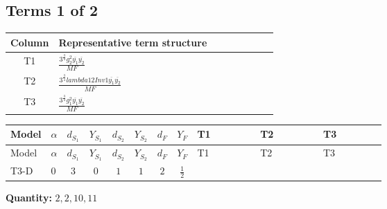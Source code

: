\documentclass[8pt]{article}
\begin{document}
\begin{landscape}
\subsection*{Terms 1 of 2}
\begin{center}
\begin{tabular}{@{}c >{\raggedright\arraybackslash}p{0.82\linewidth}@{}}
\toprule
Column & Representative term structure \\
\midrule
T1 & \(\displaystyle \frac{3^{\frac{3}{4}} g_{2}^{2} \overline{y_{1}} \overline{y_{2}}}{MF}\) \\
\midrule
T2 & \(\displaystyle \frac{3^{\frac{3}{4}} lambda12Inv1 \overline{y_{1}} \overline{y_{2}}}{MF}\) \\
\midrule
T3 & \(\displaystyle \frac{3^{\frac{3}{4}} g_{1}^{2} \overline{y_{1}} \overline{y_{2}}}{MF}\) \\
\midrule
\bottomrule
\end{tabular}
\end{center}
\smallskip
\tiny
\begin{longtable}{@{}llcccccc >{\raggedright\arraybackslash}p{0.21\linewidth} >{\raggedright\arraybackslash}p{0.21\linewidth} >{\raggedright\arraybackslash}p{0.21\linewidth}@{}}
\toprule
Model & $\alpha$ & $d_{S_1}$ & $Y_{S_1}$ & $d_{S_2}$ & $Y_{S_2}$ & $d_F$ & $Y_F$ & T1 & T2 & T3 \\
\midrule
\endfirsthead
\toprule
Model & $\alpha$ & $d_{S_1}$ & $Y_{S_1}$ & $d_{S_2}$ & $Y_{S_2}$ & $d_F$ & $Y_F$ & T1 & T2 & T3 \\
\midrule
\endhead
T3-D & $0$ & $3$ & $0$ & $1$ & $1$ & $2$ & $\frac{1}{2}$ & \scriptsize\adjustbox{max width=\linewidth}{$\begin{gathered} - \frac{17 \cdot 3^{\frac{3}{4}} g_{2}^{2} \overline{y_{1}} \overline{y_{2}}}{24 MF}\end{gathered}$} & \scriptsize\adjustbox{max width=\linewidth}{$\begin{gathered} - \frac{3^{\frac{3}{4}} lambda12Inv1 \overline{y_{1}} \overline{y_{2}}}{6 MF}\end{gathered}$} & \scriptsize\adjustbox{max width=\linewidth}{$\begin{gathered} - \frac{3^{\frac{3}{4}} g_{1}^{2} \overline{y_{1}} \overline{y_{2}}}{8 MF}\end{gathered}$} \\
\midrule
\bottomrule
\end{longtable}
\clearpage
\noindent\textbf{Quantity: }$\mathrm{2,2,10,11}$\par\smallskip

\end{landscape}
\end{document}
